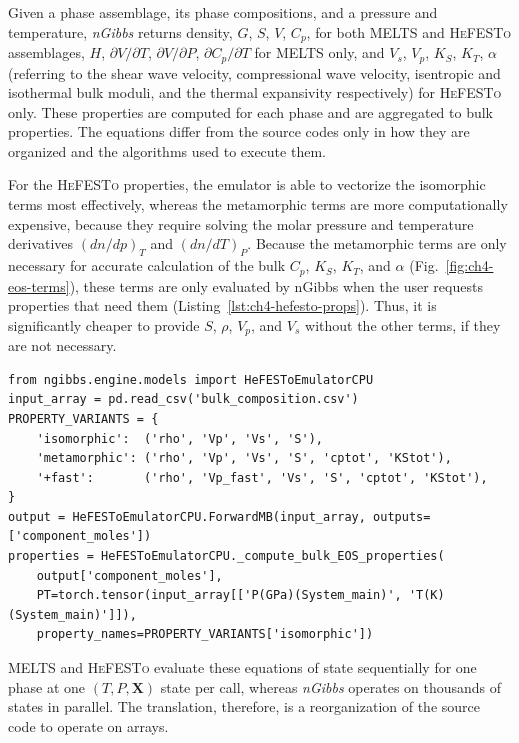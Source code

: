 Given a phase assemblage, its phase compositions, and a pressure and temperature, \emph{nGibbs} returns density, $G$, $S$, $V$, $C_p$, for both \textsc{MELTS} and 
\textsc{HeFESTo} assemblages, $H$, $\partial V/\partial T$,  $\partial V/\partial P$, $\partial C_p/\partial T$ for \textsc{MELTS} only, and $V_s$, $V_p$, $K_S$, 
$K_T$, $\alpha$ (referring to the shear wave velocity, compressional wave velocity, isentropic 
and isothermal bulk moduli, and the thermal expansivity respectively) for \textsc{HeFESTo} only. These properties are computed for each phase and are aggregated 
to bulk properties. The equations differ from the source codes only in how they are organized and the algorithms used to execute them.

For the \textsc{HeFESTo} properties, the emulator is able to vectorize the isomorphic terms most effectively, whereas the metamorphic terms are more computationally expensive,
because they require solving the molar pressure and temperature derivatives $(dn/dp)_T$ and $(dn/dT)_P$. Because the metamorphic terms are only necessary for 
accurate calculation of the bulk $C_p$, $K_S$, $K_T$, and $\alpha$ (Fig.~\ref{fig:ch4-eos-terms}), these terms are only evaluated by nGibbs when the user requests properties that need them 
(Listing~\ref{lst:ch4-hefesto-props}). Thus, it is significantly cheaper to provide $S$, $\rho$, $V_p$, and $V_s$ without the other terms, if they are not 
necessary.

\begin{lstlisting}[style=thesispython, caption={Computing bulk \textsc{HeFESTo} properties for an \emph{nGibbs} assemblage,
requesting either the isomorphic terms only or the metamorphic terms as well (pseudocode).},
label={lst:ch4-hefesto-props}]
from ngibbs.engine.models import HeFESToEmulatorCPU
input_array = pd.read_csv('bulk_composition.csv')
PROPERTY_VARIANTS = {
    'isomorphic':  ('rho', 'Vp', 'Vs', 'S'),
    'metamorphic': ('rho', 'Vp', 'Vs', 'S', 'cptot', 'KStot'),
    '+fast':       ('rho', 'Vp_fast', 'Vs', 'S', 'cptot', 'KStot'),
}
output = HeFESToEmulatorCPU.ForwardMB(input_array, outputs=['component_moles'])
properties = HeFESToEmulatorCPU._compute_bulk_EOS_properties(
    output['component_moles'],
    PT=torch.tensor(input_array[['P(GPa)(System_main)', 'T(K)(System_main)']]),
    property_names=PROPERTY_VARIANTS['isomorphic'])
\end{lstlisting}

\textsc{MELTS} and \textsc{HeFESTo} evaluate these equations of state sequentially for one phase at one $(T,P,\mathbf{X})$ state per call, whereas
\emph{nGibbs} operates on thousands of states in parallel. The translation, therefore, is a reorganization of the source code to operate on arrays.

